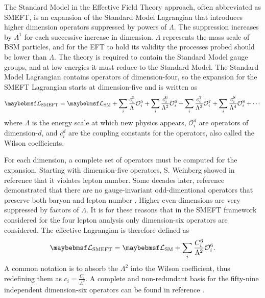 The Standard Model in the Effective Field Theory approach, often abbreviated as SMEFT, is an expansion of the Standard Model Lagrangian that introduces higher dimension operators suppressed by powers of $\Lambda$. The suppression increases by $\Lambda^1$ for each successive increase in dimension. $\Lambda$ represents the mass scale of BSM particles, and for the EFT to hold its validity the processes probed should be lower than $\Lambda$. The theory is required to contain the Standard Model gauge groups, and at low energies it must reduce to the Standard Model. The Standard Model Lagrangian contains operators of dimension-four, so the expansion for the SMEFT Lagrangian starts at dimension-five and is written as
\begin{equation}
    \lagrangian_{\text{SMEFT}}=\lagrangian_{\text{SM}} + \sum_{i}\dfrac{c_i^5}{\Lambda^{}}\mathcal{O}_i^5 + \sum_{i}\dfrac{c_i^6}{\Lambda^{2}}\mathcal{O}_i^6 + \sum_{i}\dfrac{c_i^7}{\Lambda^{3}}\mathcal{O}_i^7 + 
    \sum_{i}\dfrac{c_i^8}{\Lambda^{4}}\mathcal{O}_i^8 +\cdots
\end{equation}
where $\Lambda$ is the energy scale at which new physics appears, $\mathcal{O}_i^d$ are operators of dimension-$d$, and $c_i^d$ are the coupling constants for the operators, also called the Wilson coefficients. 

For each dimension, a complete set of operators must be computed for the expansion. Starting with dimension-five operators, S. Weinberg showed in reference \cite{Weinberg_1979} that it violates lepton number. Some decades later, reference \cite{de_Gouv_a_2014} demonstrated that there are no \SMgroup gauge-invariant odd-dimentional operators that preserve both baryon and lepton number \cite{Kobach_2016}. Higher even dimensions are very suppressed by factors of $\Lambda$. It is for these reasons that in the SMEFT framework considered for the four lepton analysis only dimension-six operators are considered. The effective Lagrangian is therefore defined as 
\begin{equation} \label{eq:SMEFTdim6lagragian}
    \lagrangian_{\text{SMEFT}}=\lagrangian_{\text{SM}} + \sum_{i}\dfrac{C_i^6}{\Lambda^{2}}\mathcal{O}_i^6.
\end{equation}
A common notation is to absorb the $\Lambda^2$ into the Wilson coefficient, thus redefining them as $c_i=\frac{C_i}{\Lambda^2}$. A complete and non-redundant basis for the fifty-nine independent dimension-six operators can be found in reference \cite{Grzadkowski_2010}.


